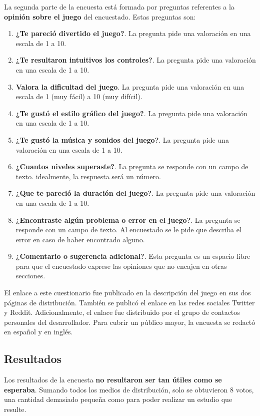 La segunda parte de la encuesta está formada por preguntas referentes a la \textbf{opinión sobre el juego} del encuestado. Estas preguntas son:
\begin{enumerate}
\item \textbf{¿Te pareció divertido el juego?}. La pregunta pide una valoración en una escala de 1 a 10.
\item \textbf{¿Te resultaron intuitivos los controles?}. La pregunta pide una valoración en una escala de 1 a 10.
\item \textbf{Valora la dificultad del juego}. La pregunta pide una valoración en una escala de 1 (muy fácil) a 10 (muy difícil).
\item \textbf{¿Te gustó el estilo gráfico del juego?}. La pregunta pide una valoración en una escala de 1 a 10.
\item \textbf{¿Te gustó la música y sonidos del juego?}. La pregunta pide una valoración en una escala de 1 a 10.
\item \textbf{¿Cuantos niveles superaste?}. La pregunta se responde con un campo de texto. idealmente, la respuesta será un número.
\item \textbf{¿Que te pareció la duración del juego?}. La pregunta pide una valoración en una escala de 1 a 10.
\item \textbf{¿Encontraste algún problema o error en el juego?}. La pregunta se responde con un campo de texto. Al encuestado se le pide que describa el error en caso de haber encontrado alguno.
\item \textbf{¿Comentario o sugerencia adicional?}. Esta pregunta es un espacio libre para que el encuestado exprese las opiniones que no encajen en otras secciones.
\end{enumerate}

El enlace a este cuestionario fue publicado en la descripción del juego en sus dos páginas de distribución. También se publicó el enlace en las redes sociales Twitter y Reddit. Adicionalmente, el enlace fue distribuido por el grupo de contactos personales del desarrollador. Para cubrir un público mayor, la encuesta se redactó en español y en inglés.

\subsection{Resultados}
Los resultados de la encuesta \textbf{no resultaron ser tan útiles como se esperaba}. Sumando todos los medios de distribución, solo se obtuvieron 8 votos, una cantidad demasiado pequeña como para poder realizar un estudio que resulte.

